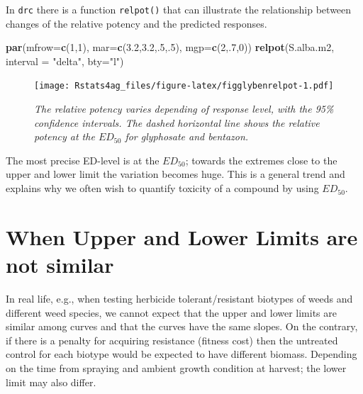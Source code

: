 \documentclass[letterpaper,]{book}
\newenvironment{Shaded}{\begin{snugshade}}{\end{snugshade}}
\newcommand{\DataTypeTok}[1]{\textcolor[rgb]{0.13,0.29,0.53}{#1}}
\newcommand{\DecValTok}[1]{\textcolor[rgb]{0.00,0.00,0.81}{#1}}
\newcommand{\FloatTok}[1]{\textcolor[rgb]{0.00,0.00,0.81}{#1}}
\newcommand{\KeywordTok}[1]{\textcolor[rgb]{0.13,0.29,0.53}{\textbf{#1}}}
\newcommand{\NormalTok}[1]{#1}
\newcommand{\StringTok}[1]{\textcolor[rgb]{0.31,0.60,0.02}{#1}}
\begin{document}
In \texttt{drc} there is a function \texttt{relpot()} that can illustrate the relationship between changes of the relative potency and the predicted responses.



\begin{Shaded}
\begin{Highlighting}[]
\KeywordTok{par}\NormalTok{(}\DataTypeTok{mfrow=}\KeywordTok{c}\NormalTok{(}\DecValTok{1}\NormalTok{,}\DecValTok{1}\NormalTok{), }\DataTypeTok{mar=}\KeywordTok{c}\NormalTok{(}\FloatTok{3.2}\NormalTok{,}\FloatTok{3.2}\NormalTok{,.}\DecValTok{5}\NormalTok{,.}\DecValTok{5}\NormalTok{), }\DataTypeTok{mgp=}\KeywordTok{c}\NormalTok{(}\DecValTok{2}\NormalTok{,.}\DecValTok{7}\NormalTok{,}\DecValTok{0}\NormalTok{))}
\KeywordTok{relpot}\NormalTok{(S.alba.m2, }\DataTypeTok{interval =} \StringTok{"delta"}\NormalTok{, }\DataTypeTok{bty=}\StringTok{"l"}\NormalTok{)}
\end{Highlighting}
\end{Shaded}

\begin{figure}
\centering
\texttt{[image: Rstats4ag\_files/figure-latex/figglybenrelpot-1.pdf]}
\caption{\label{fig:figglybenrelpot}\emph{The relative potency varies depending of response level, with the 95\% confidence intervals. The dashed horizontal line shows the relative potency at the \(ED_{50}\) for glyphosate and bentazon.}}
\end{figure}

The most precise ED-level is at the \(ED_{50}\); towards the extremes close to the upper and lower limit the variation becomes huge. This is a general trend and explains why we often wish to quantify toxicity of a compound by using \(ED_{50}\).

\hypertarget{when-upper-and-lower-limits-are-not-similar}{%
\section{When Upper and Lower Limits are not similar}\label{when-upper-and-lower-limits-are-not-similar}}

In real life, e.g., when testing herbicide tolerant/resistant biotypes of weeds and different weed species, we cannot expect that the upper and lower limits are similar among curves and that the curves have the same slopes. On the contrary, if there is a penalty for acquiring resistance (fitness cost) then the untreated control for each biotype would be expected to have different biomass. Depending on the time from spraying and ambient growth condition at harvest; the lower limit may also differ.
\end{document}
